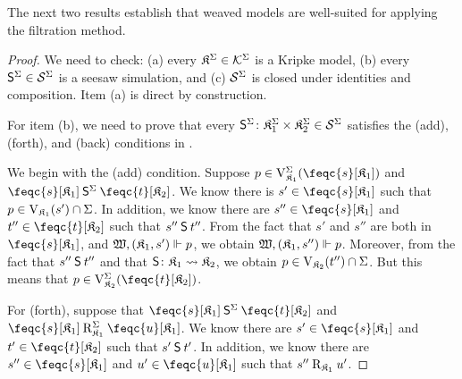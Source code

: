 The next two results establish that weaved models are well-suited for applying the filtration method.

\begin{proof}
    \setcounter{ieqnnum}{0}
    We need to check:
        (a) every $\fmodel \in \Kfwm$ is a Kripke model,
        (b) every $\fSim \in \Sfwm$ is a seesaw simulation, and
        (c) $\Sfwm$ is closed under identities and composition.
    Item (a) is direct by construction.
    
    \medskip
    \noindent
    For item (b), we need to prove that every $\fSim \colon \fmodel[1] \times \fmodel[2] \in \Sfwm$ satisfies the (add), (forth), and (back) conditions in .

    \medskip
    \noindent
    We begin with the (add) condition.
    Suppose $p \in \Vfm[1](\feqc{s}[\kmodel_1])$ and $\feqc{s}[\kmodel_1] \fSim \feqc{t}[\kmodel_2]$.
    We know there is $s' \in \feqc{s}[\kmodel_1]$ such that $p \in \Vkm[1](s') \cap \fset$.
    In addition, we know there are $s'' \in \feqc{s}[\kmodel_1]$ and $t'' \in \feqc{t}[\kmodel_2]$ such that $s'' \Sim t''$.
    From the fact that $s'$ and $s''$ are both in $\feqc{s}[\kmodel_1]$, and $\wforces{\pair {\kmodel_1} {s'}}{p}$, we obtain $\wforces{\pair {\kmodel_1} {s''}}{p}$.
    Moreover, from the fact that $s'' \Sim t''$ and that $\Sim\colon \kmodel_1 \fsim \kmodel_2$, we obtain $p \in \Vkm[2](t'') \cap \fset$.
    But this means that $p \in \Vfm[2](\feqc{t}[\kmodel_2])$.

    \medskip
    \noindent
    For (forth), suppose that $\feqc{s}[\kmodel_1] \fSim \feqc{t}[\kmodel_2]$ and $\feqc{s}[\kmodel_1] \Rfm[1] \feqc{u}[\kmodel_1]$.
    We know there are $s' \in \feqc{s}[\kmodel_1]$ and $t' \in \feqc{t}[\kmodel_2]$ such that $s' \Sim t'$.
    In addition, we know there are $s'' \in \feqc{s}[\kmodel_1]$ and $u' \in \feqc{u}[\kmodel_1]$ such that $s'' \Rkm[1] u'$.
\end{proof}

